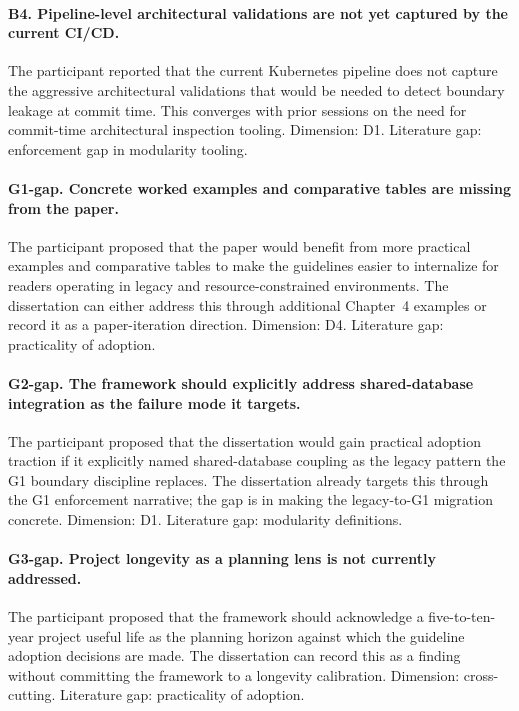 \paragraph*{B4. Pipeline-level architectural validations are not yet captured by the current CI/CD.} The participant reported that the current Kubernetes pipeline does not capture the aggressive architectural validations that would be needed to detect boundary leakage at commit time. This converges with prior sessions on the need for commit-time architectural inspection tooling. Dimension: D1. Literature gap: enforcement gap in modularity tooling.

\paragraph*{G1-gap. Concrete worked examples and comparative tables are missing from the paper.} The participant proposed that the paper would benefit from more practical examples and comparative tables to make the guidelines easier to internalize for readers operating in legacy and resource-constrained environments. The dissertation can either address this through additional Chapter~4 examples or record it as a paper-iteration direction. Dimension: D4. Literature gap: practicality of adoption.

\paragraph*{G2-gap. The framework should explicitly address shared-database integration as the failure mode it targets.} The participant proposed that the dissertation would gain practical adoption traction if it explicitly named shared-database coupling as the legacy pattern the G1 boundary discipline replaces. The dissertation already targets this through the G1 enforcement narrative; the gap is in making the legacy-to-G1 migration concrete. Dimension: D1. Literature gap: modularity definitions.

\paragraph*{G3-gap. Project longevity as a planning lens is not currently addressed.} The participant proposed that the framework should acknowledge a five-to-ten-year project useful life as the planning horizon against which the guideline adoption decisions are made. The dissertation can record this as a finding without committing the framework to a longevity calibration. Dimension: cross-cutting. Literature gap: practicality of adoption.

